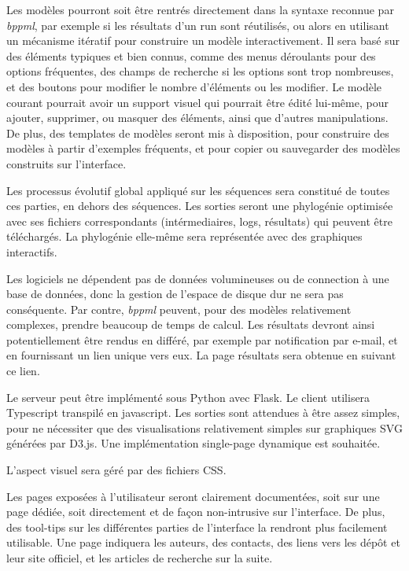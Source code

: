 Les modèles pourront
soit être rentrés directement dans la syntaxe reconnue par \textit{bppml},
par exemple si les résultats d'un run sont réutilisés,
ou alors en utilisant un mécanisme itératif pour construire un modèle interactivement.
Il sera basé sur des éléments typiques et bien connus,
comme des menus déroulants pour des options fréquentes,
des champs de recherche si les options sont trop nombreuses,
et des boutons pour modifier le nombre d'éléments ou les modifier.
Le modèle courant pourrait avoir un support visuel
qui pourrait être édité lui-même,
pour ajouter, supprimer, ou masquer des éléments,
ainsi que d'autres manipulations.
De plus, des templates de modèles seront mis à disposition,
pour construire des modèles à partir d'exemples fréquents,
et pour copier ou sauvegarder des modèles construits sur l'interface.

Les processus évolutif global appliqué sur les séquences
sera constitué de toutes ces parties, en dehors des séquences.
Les sorties seront une phylogénie optimisée
avec ses fichiers correspondants
(intérmediaires, logs, résultats)
qui peuvent être téléchargés.
La phylogénie elle-même sera représentée avec des graphiques interactifs.

Les logiciels ne dépendent pas de données volumineuses
ou de connection à une base de données,
donc la gestion de l'espace de disque dur ne sera pas conséquente.
Par contre, \textit{bppml} peuvent,
pour des modèles relativement complexes,
prendre beaucoup de temps de calcul.
Les résultats devront ainsi potentiellement
être rendus en différé,
par exemple par notification par e-mail,
et en fournissant un lien unique vers eux.
La page résultats sera obtenue en suivant ce lien.

Le serveur peut être implémenté sous Python avec Flask.
Le client utilisera Typescript transpilé en javascript.
Les sorties sont attendues à être assez simples,
pour ne nécessiter que des visualisations relativement simples
sur graphiques SVG générées par D3.js.
Une implémentation single-page dynamique est souhaitée.

L'aspect visuel sera géré par des fichiers CSS.

Les pages exposées à l'utilisateur seront clairement documentées,
soit sur une page dédiée,
soit directement et de façon non-intrusive sur l'interface.
De plus, des tool-tips sur les différentes parties de l'interface
la rendront plus facilement utilisable.
Une page indiquera les auteurs, des contacts,
des liens vers les dépôt et leur site officiel,
et les articles de recherche sur la suite.

